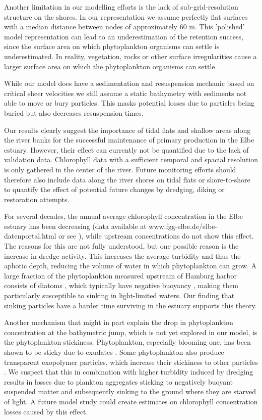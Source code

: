 \documentclass[npg, manuscript]{copernicus}
\begin{document}
Another limitation in our modelling efforts is the lack of sub-grid-resolution structure on the shores.
In our representation we assume perfectly flat surfaces with a median distance between nodes of approximately 60 \unit{m}. 
This 'polished' model representation can lead to an underestimation of the retention success, since the surface area on which phytoplankton organisms can settle is underestimated.
In reality, vegetation, rocks or other surface irregularities cause a larger surface area on which the phytoplankton organisms can settle.

While our model does have a sedimentation and resuspension mechanic based on critical sheer velocities we still assume a static bathymetry with sediments not able to move or bury particles. 
This masks potential losses due to particles being buried but also decreases resuspension times.




Our results clearly suggest the importance of tidal flats and shallow areas along the river banks for the successful maintenance of primary production in the Elbe estuary. 
However, their effect can currently not be quantified due to the lack of validation data.
Chlorophyll data with a sufficient temporal and spacial resolution is only gathered in the center of the river.
Future monitoring efforts should therefore also include data along the river shores on tidal flats or shore-to-shore to quantify the effect of potential future changes by dredging, diking or restoration attempts.

For several decades, the annual average chlorophyll concentration in the Elbe estuary has been decreasing (data available at www.fgg-elbe.de/elbe-datenportal.html or see \citep{Hardenbicker2014,Schol2014}), while upstream concentrations do not show this effect.
The reasons for this are not fully understood, but one possible reason is the increase in dredge activity.
This increases the average turbidity and thus the aphotic depth, reducing the volume of water in which phytoplankton can grow.
A large fraction of the phytoplankton measured upstream of Hamburg harbor consists of diatoms \citep{Muylaert1999}, which typically have negative buoyancy \citep{Passow1991}, making them particularly susceptible to sinking in light-limited waters.
Our finding that sinking particles have a harder time surviving in the estuary supports this theory.

Another mechanism that might in part explain the drop in phytoplankton concentration at the bathymetric jump, which is not yet explored in our model, is the phytoplankton stickiness.
Phytoplankton, especially blooming one, has been shown to be sticky due to exudates \citep{Kiørboe1993,VanderLee2000,Dutz2005}. 
Some phytoplankton also produce transparent exopolymer particles, which increase their stickiness to other particles \citep{Windler,DeBrouwer2005}.
We suspect that this in combination with  higher turbidity induced by dredging results in losses due to plankton aggregates sticking to negatively buoyant suspended matter and subsequently sinking to the ground where they are starved of light.
A future model study could create estimates on chlorophyll concentration losses caused by this effect.
\end{document}
